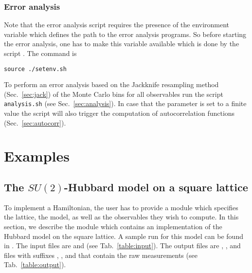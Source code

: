 \documentclass{SciPost}
\begin{document}
\subsubsection{Error analysis}
%
Note that the error analysis script requires the presence of the environment variable  which defines the path to the error analysis programs.
So before starting the error analysis, one has to make this variable available which is done by the script . The command is
\begin{verbatim}
source ./setenv.sh
\end{verbatim}
To perform an error analysis based on the Jackknife resampling method (Sec.~\ref{sec:jack})  of the Monte Carlo bins for all observables run the script \texttt{analysis.sh} 
(see Sec.~\ref{sec:analysis}). In case that the parameter  is set to a finite value the script will also trigger the computation of autocorrelation functions (Sec.~\ref{sec:autocorr}).

\section{Examples}\label{sec:ex}
%
\subsection{The $SU(2)$-Hubbard model on a square lattice}\label{sec:walk1}
%
To implement a Hamiltonian, the user has to provide  a module   which  specifies the lattice, the model, as well as the observables  they wish to compute. 
In this section, we describe the module 
 which contains an implementation of the Hubbard model on the square lattice. 
A sample run for this model can be found in .
The input files are  and  (see Tab.~\ref{table:input}). The output files are , , and files with suffixes , , and  that 
contain the raw measurements (see Tab.~\ref{table:output}).
\end{document}
